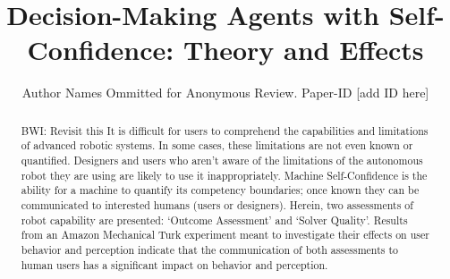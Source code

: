 \documentclass[conference,10pt]{IEEEtran}
\newcommand{\hlb}[1]{{\color{blue} #1}}
\newcommand{\brett}[1]{\hlb{BWI: #1}}
\begin{document}
\title{Decision-Making Agents with Self-Confidence: Theory and Effects}
\author{Author Names Ommitted for Anonymous Review. Paper-ID [add ID here]} 

\maketitle

\begin{abstract}
    \brett{Revisit this}
    It is difficult for users to comprehend the capabilities and limitations of advanced robotic systems. In some cases, these limitations are not even known or quantified. Designers and users who aren't aware of the limitations of the autonomous robot they are using are likely to use it inappropriately. Machine Self-Confidence is the ability for a machine to quantify its competency boundaries; once known they can be communicated to interested humans (users or designers). Herein, two assessments of robot capability are presented: `Outcome Assessment' and `Solver Quality'. Results from an Amazon Mechanical Turk experiment meant to investigate their effects on user behavior and perception indicate that the communication of both assessments to human users has a significant impact on behavior and perception.
\end{abstract}

\IEEEpeerreviewmaketitle












\appendices

\end{document}
